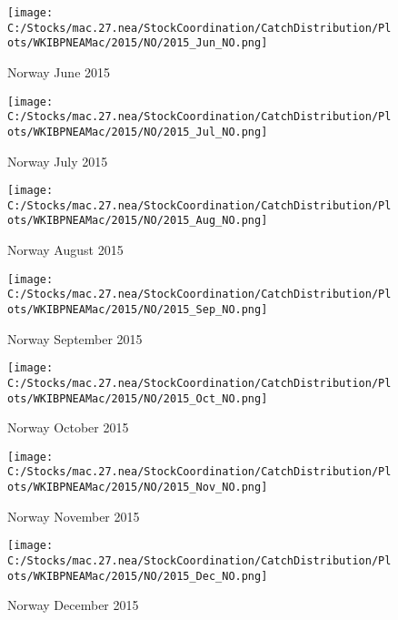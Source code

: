 \documentclass{article}
\begin{document}
\begin{figure}
	\centering
		\texttt{[image: C:/Stocks/mac.27.nea/StockCoordination/CatchDistribution/Plots/WKIBPNEAMac/2015/NO/2015\_Jun\_NO.png]}
	\caption{Norway June 2015}
	\label{fig:2015_Jun_NO}
\end{figure}

\begin{figure}
	\centering
		\texttt{[image: C:/Stocks/mac.27.nea/StockCoordination/CatchDistribution/Plots/WKIBPNEAMac/2015/NO/2015\_Jul\_NO.png]}
	\caption{Norway July 2015}
	\label{fig:2015_Jul_NO}
\end{figure}

\begin{figure}
	\centering
		\texttt{[image: C:/Stocks/mac.27.nea/StockCoordination/CatchDistribution/Plots/WKIBPNEAMac/2015/NO/2015\_Aug\_NO.png]}
	\caption{Norway August 2015}
	\label{fig:2015_Aug_NO}
\end{figure}

\begin{figure}
	\centering
		\texttt{[image: C:/Stocks/mac.27.nea/StockCoordination/CatchDistribution/Plots/WKIBPNEAMac/2015/NO/2015\_Sep\_NO.png]}
	\caption{Norway September 2015}
	\label{fig:2015_Sep_NO}
\end{figure}

\begin{figure}
	\centering
		\texttt{[image: C:/Stocks/mac.27.nea/StockCoordination/CatchDistribution/Plots/WKIBPNEAMac/2015/NO/2015\_Oct\_NO.png]}
	\caption{Norway October 2015}
	\label{fig:2015_Oct_NO}
\end{figure}

\begin{figure}
	\centering
		\texttt{[image: C:/Stocks/mac.27.nea/StockCoordination/CatchDistribution/Plots/WKIBPNEAMac/2015/NO/2015\_Nov\_NO.png]}
	\caption{Norway November 2015}
	\label{fig:2015_Nov_NO}
\end{figure}

\begin{figure}
	\centering
		\texttt{[image: C:/Stocks/mac.27.nea/StockCoordination/CatchDistribution/Plots/WKIBPNEAMac/2015/NO/2015\_Dec\_NO.png]}
	\caption{Norway December 2015}
	\label{fig:2015_Dec_NO}
\end{figure}

\clearpage

\newpage
\end{document}
